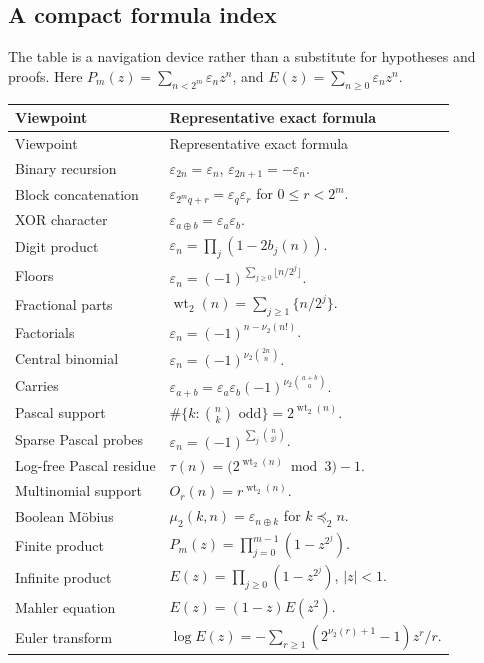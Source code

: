 \documentclass[11pt,oneside]{article}
\numberwithin{equation}{section}
\theoremstyle{definition}
\theoremstyle{remark}
\newcommand{\wt}{\operatorname{wt}_2}
\newcommand{\vtwo}{\nu_2}
\newcommand{\eps}{\varepsilon}
\newcommand{\xor}{\mathbin{\oplus}}
\newcommand{\submask}{\mathrel{\preccurlyeq_2}}
\begin{document}
\subsection{A compact formula index}

The table is a navigation device rather than a substitute for hypotheses and
proofs.  Here \(P_m(z)=\sum_{n<2^m}\eps_nz^n\), and
\(E(z)=\sum_{n\ge0}\eps_nz^n\).

\renewcommand{\arraystretch}{1.18}
\begin{longtable}{@{}p{}p{}@{}}
\toprule
Viewpoint & Representative exact formula \\
\midrule
\endfirsthead
\toprule
Viewpoint & Representative exact formula \\
\midrule
\endhead
Binary recursion & \(\eps_{2n}=\eps_n\), \(\eps_{2n+1}=-\eps_n\). \\
Block concatenation & \(\eps_{2^mq+r}=\eps_q\eps_r\) for \(0\le r<2^m\). \\
XOR character & \(\eps_{a\xor b}=\eps_a\eps_b\). \\
Digit product & \(\eps_n=\prod_j(1-2b_j(n))\). \\
Floors & \(\eps_n=(-1)^{\sum_{j\ge0}\lfloor n/2^j\rfloor}\). \\
Fractional parts & \(\wt(n)=\sum_{j\ge1}\{n/2^j\}\). \\
Factorials & \(\eps_n=(-1)^{n-\vtwo(n!)}\). \\
Central binomial & \(\eps_n=(-1)^{\vtwo\binom{2n}{n}}\). \\
Carries & \(\eps_{a+b}=\eps_a\eps_b(-1)^{\vtwo\binom{a+b}{a}}\). \\
Pascal support & \(\#\{k:\binom nk\text{ odd}\}=2^{\wt(n)}\). \\
Sparse Pascal probes & \(\eps_n=(-1)^{\sum_j\binom{n}{2^j}}\). \\
Log-free Pascal residue & \(\tau(n)=\bigl(2^{\wt(n)}\bmod3\bigr)-1\). \\
Multinomial support & \(O_r(n)=r^{\wt(n)}\). \\
Boolean M\"obius & \(\mu_2(k,n)=\eps_{n\xor k}\) for \(k\submask n\). \\
Finite product & \(P_m(z)=\prod_{j=0}^{m-1}(1-z^{2^j})\). \\
Infinite product & \(E(z)=\prod_{j\ge0}(1-z^{2^j})\), \(|z|<1\). \\
Mahler equation & \(E(z)=(1-z)E(z^2)\). \\
Euler transform & \(\log E(z)=-\sum_{r\ge1}(2^{\vtwo(r)+1}-1)z^r/r\). \\

\end{longtable}
\end{document}
